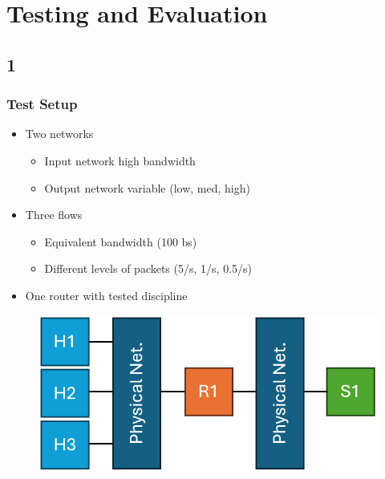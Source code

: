 \documentclass[compress]{beamer}
\begin{document}
    \section{Testing and Evaluation}

    \subsection{1}
    \begin{frame}
        \frametitle{Test Setup}

        \begin{itemize}
            \item Two networks
            \begin{itemize}
                \item Input network high bandwidth
                \item Output network variable (low, med, high)
            \end{itemize}
            \item Three flows
            \begin{itemize}
                \item Equivalent bandwidth (100 bs)
                \item Different levels of packets (5/s, 1/s, 0.5/s)
            \end{itemize}
            \item One router with tested discipline
        \end{itemize}

        \begin{figure}[b]
            \centering
            \includegraphics[height=0.2\textheight]{img/test-network}
        \end{figure}
    \end{frame}
\end{document}
